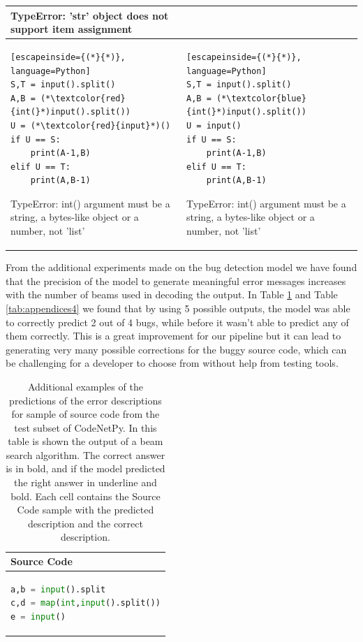 \documentclass[12pt,a4paper]{report}
\begin{document}
\begin{appendices}
\begin{table}[H]
\begin{tabular}{p{7.5cm} p{7.5cm}}
TypeError: 'str' object does not support item assignment
\\

\hline
\begin{lstlisting}[escapeinside={(*}{*)}, language=Python]
S,T = input().split() 
A,B = (*\textcolor{red}{int(}*)input().split()) 
U = (*\textcolor{red}{input}*)() 
if U == S: 
  	print(A-1,B) 
elif U == T: 
    print(A,B-1) 
\end{lstlisting}

TypeError: int() argument must be a string, a bytes-like object or a number, not 'list' & 
\begin{lstlisting}[escapeinside={(*}{*)}, language=Python]
S,T = input().split() 
A,B = (*\textcolor{blue}{int(}*)input().split()) 
U = input() 
if U == S: 
  	print(A-1,B) 
elif U == T: 
    print(A,B-1) 
\end{lstlisting}

TypeError: int() argument must be a string, a bytes-like object or a number, not 'list'
\\

\end{tabular}
\end{table}

From the additional experiments made on the bug detection model we have found that the precision of the model to generate meaningful error messages increases with the number of beams used in decoding the output. In Table \ref{tab:appendices3} and Table \ref{tab:appendices4} we found that by using 5 possible outputs, the model was able to correctly predict 2 out of 4 bugs, while before it wasn't able to predict any of them correctly. This is a great improvement for our pipeline but it can lead to generating very many possible corrections for the buggy source code, which can be challenging for a developer to choose from without help from testing tools.

\begin{table}[H]\small\linespread{1}
\centering
\caption{Additional examples of the predictions of the error descriptions for sample of source code from the test subset of CodeNetPy. In this table is shown the output of a beam search algorithm. The correct answer is in bold, and if the model predicted the right answer in underline and bold. Each cell contains the Source Code sample with the predicted description and the correct description.}
\label{tab:appendices3}
\begin{tabular}{p{15cm}}
\textbf{Source Code} \\
\hline
\begin{lstlisting}[language=Python]
a,b = input().split
c,d = map(int,input().split())
e = input()


\end{lstlisting}
\end{tabular}
\end{table}
\end{appendices}
\end{document}
